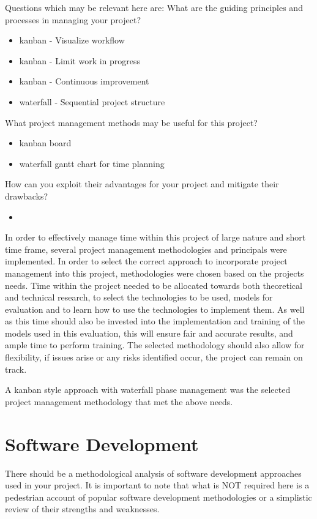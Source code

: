 Questions which may be relevant here are:
What are the guiding principles and processes in managing your project?
\begin{itemize}
\item kanban - Visualize workflow
\item kanban - Limit work in progress
\item kanban - Continuous improvement
\item waterfall - Sequential project structure
\end{itemize} 

What project management methods may be useful for this project?
\begin{itemize}
\item kanban board
\item waterfall gantt chart for time planning
\end{itemize}

How can you exploit their advantages for your project and mitigate their drawbacks?
\begin{itemize}
\item 
\end{itemize}


In order to effectively manage time within this project of large nature and short time frame, several project management methodologies and principals were implemented. In order to select the correct approach to incorporate project management into this project, methodologies were chosen based on the projects needs. Time within the project needed to be allocated towards both theoretical and technical research, to select the technologies to be used, models for evaluation and to learn how to use the technologies to implement them. As well as this time should also be invested into the implementation and training of the models used in this evaluation, this will ensure fair and accurate results, and ample time to perform training. The selected methodology should also allow for flexibility, if issues arise or any risks identified occur, the project can remain on track.

A kanban style approach with waterfall phase management was the selected project management methodology that met the above needs.





\section{Software Development}
There should be a methodological analysis of software development approaches used in your project. It is important to note that what is NOT required here is a pedestrian account of popular software development methodologies or a simplistic review of their strengths and weaknesses. 

